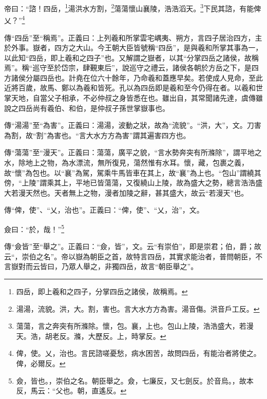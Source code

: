 帝曰：“諮！四岳，\footnote{四岳，即上羲和之四子，分掌四岳之諸侯，故稱焉。}湯洪水方割，\footnote{湯湯，流貌。洪，大。割，害也。言大水方方為害。湯音傷。洪音戶工反。}蕩蕩懷山襄陵，浩浩滔天。\footnote{蕩蕩，言之奔突有所滌除。懷，包。襄，上也。包山上陵，浩浩盛大，若漫天。浩，胡老反。滌，大歷反。上，時掌反。}下民其諮，有能俾乂？”\footnote{俾，使。乂，治也。言民諮嗟憂愁，病水困苦，故問四岳，有能治者將使之。俾，必爾反。}

{\noindent\zhuan{}\fzbyks 傳“四岳”至“稱焉”。正義曰：上列羲和所掌雲宅嵎夷、朔方，言四子居治四方，主於外事。嶽者，四方之大山。今王朝大臣皆號稱“四岳”，是與羲和所掌其事為一，以此知“四岳，即上羲和之四子”也。又解謂之嶽者，以其“分掌四岳之諸侯，故稱焉”。稱“巡守至於岱宗，肆覲東后”，說巡守之禮云，諸侯各朝於方岳之下，是四方諸侯分屬四岳也。計堯在位六十餘年，乃命羲和蓋應早矣。若使成人見命，至此近將百歲，故馬、鄭以為羲和皆死。孔以為四岳即是羲和至今仍得在者。以羲和世掌天地，自當父子相承，不必仲叔之身皆悉在也。雖出自，其常聞諸先達，虞傳雖說之四岳尚有羲伯、和伯，是仲叔子孫世掌嶽事也。 \par}

{\noindent\zhuan{}\fzbyks 傳“湯湯”至“為害”。正義曰：湯湯，波動之狀，故為“流貌”。“洪，大”，文。刀害為割，故“割”為害也。“言大水方方為害”謂其遍害四方也。 \par}

{\noindent\zhuan{}\fzbyks 傳“蕩蕩”至“漫天”。正義曰：蕩蕩，廣平之貌，“言水勢奔突有所滌除”，謂平地之水，除地上之物，為水漂流，無所復見，蕩然惟有水耳。懷，藏，包裹之義，故“懷”為包也。以“襄”為駕，駕乘牛馬皆車在其上，故“襄”為上也。“包山”謂繞其傍，“上陵”謂乘其上，平地已皆蕩蕩，又復繞山上陵，故為盛大之勢，總言浩浩盛大若漫天然也。天者無上之物，漫者加陵之辭，甚其盛大，故云“若漫天”也。 \par}

{\noindent\zhuan{}\fzbyks 傳“俾，使”、“乂，治也”。正義曰：“俾，使”、“乂，治”，文。 \par}

僉曰：“於，哉！”\footnote{僉，皆也。，崇伯之名。朝臣舉之。僉，七廉反，又七劍反。於音烏。，故本反，馬云：“父也。朝，直遙反。}

{\noindent\zhuan{}\fzbyks 傳“僉皆”至“舉之”。正義曰：“僉，皆”，文。云“有崇伯”，即是崇君；伯，爵；故云“，崇伯之名”。帝以嶽為朝臣之首，故特言四岳，其實求能治者，普問朝臣，不言嶽對而云皆曰，乃眾人舉之，非獨四岳，故言“朝臣舉之”。 \par}

